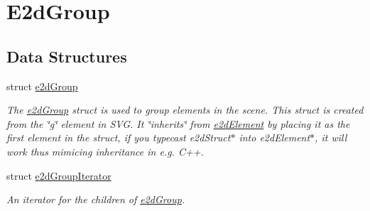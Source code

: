 \hypertarget{group__e2d_group}{\section{E2d\-Group}
\label{group__e2d_group}
}
\subsection*{Data Structures}
\begin{DoxyCompactItemize}
\item 
struct \hyperlink{structe2d_group}{e2d\-Group}
\begin{DoxyCompactList}\small\item\em The \hyperlink{structe2d_group}{e2d\-Group} struct is used to group elements in the scene. This struct is created from the \char`\"{}g\char`\"{} element in S\-V\-G. It \char`\"{}inherits\char`\"{} from \hyperlink{structe2d_element}{e2d\-Element} by placing it as the first element in the struct, if you typecast e2d\-Struct$\ast$ into e2d\-Element$\ast$, it will work thus mimicing inheritance in e.\-g. C++. \end{DoxyCompactList}\item 
struct \hyperlink{structe2d_group_iterator}{e2d\-Group\-Iterator}
\begin{DoxyCompactList}\small\item\em An iterator for the children of \hyperlink{structe2d_group}{e2d\-Group}. \end{DoxyCompactList}\end{DoxyCompactItemize}
